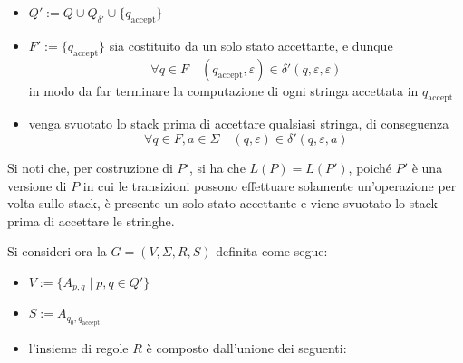 \documentclass[a4paper, 12pt]{report}
\begin{document}
{\begin{itemize}
\begin{figure}[H]
                \end{figure}

                e sia $Q_{\delta'}$ l'insieme di stati tali da permettere la non simultaneità appena descritta
            \item $Q' := Q \cup Q_{\delta '} \cup \{q_\mathrm{accept}\}$
            \item $F' := \{q_\mathrm{accept}\}$ sia costituito da un solo stato accettante, e dunque $$\forall q \in F \quad (q_\mathrm{accept}, \varepsilon) \in \delta'(q, \varepsilon, \varepsilon)$$ in modo da far terminare la computazione di ogni stringa accettata in $q_\mathrm{accept}$
            \item venga svuotato lo stack prima di accettare qualsiasi stringa, di conseguenza $$\forall q \in F, a \in \Sigma \quad (q, \varepsilon) \in \delta'(q, \varepsilon, a)$$
        \end{itemize}

        Si noti che, per costruzione di $P'$, si ha che $L(P) = L(P')$, poiché $P'$ è una versione di $P$ in cui le transizioni possono effettuare solamente un'operazione per volta sullo stack, è presente un solo stato accettante e viene svuotato lo stack prima di accettare le stringhe.

        Si consideri ora la \CFG $G = (V, \Sigma, R, S)$ definita come segue:

        \begin{itemize}
            \item $V := \{A_{p,q} \mid p, q \in Q'\}$
            \item $S := A_{q_0, q_\mathrm{accept}}$
            \item l'insieme di regole $R$ è composto dall'unione dei seguenti: 
        \end{itemize}

}
\end{document}
